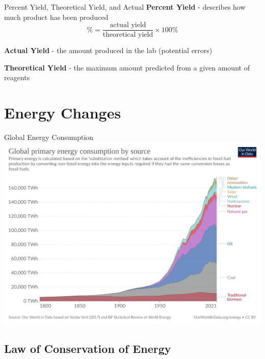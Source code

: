 \documentclass[11pt]{beamer}
\begin{document}
\begin{frame}{Percent Yield, Theoretical Yield, and Actual}
  \textbf{Percent Yield} - describes how much product has been
  produced
  \begin{equation}
    \% = \frac{\text{actual yield}}{\text{theoretical yield}} \times 100\%
  \end{equation}
 
  \textbf{Actual Yield} - the amount produced in the lab (potential errors)

  \textbf{Theoretical Yield} - the maximum amount predicted from a given amount
  of reagents
\end{frame}

\section{Energy Changes}

\begin{frame}{Global Energy Consumption}
  \centering
  \includegraphics[width=\linewidth]{global_energy}
\end{frame}

\subsection{Law of Conservation of Energy}
\end{document}
